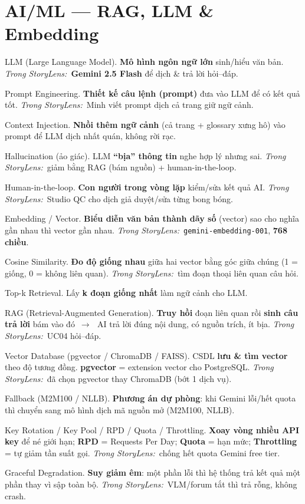 \documentclass[11pt]{article}
\newcommand{\arr}{\,\ensuremath{\rightarrow}\,}
\newcommand{\code}[1]{\texttt{\small #1}}
\newcommand{\insl}{\textit{\textcolor{steel}{Trong StoryLens:}}\ }
\begin{document}
\section{AI/ML --- RAG, LLM \& Embedding}
\begin{terms}
\item[LLM (Large Language Model).] \textbf{Mô hình ngôn ngữ lớn} sinh/hiểu văn bản. \insl \textbf{Gemini 2.5 Flash} để dịch \& trả lời hỏi--đáp.
\item[Prompt Engineering.] \textbf{Thiết kế câu lệnh (prompt)} đưa vào LLM để có kết quả tốt. \insl Minh viết prompt dịch cả trang giữ ngữ cảnh.
\item[Context Injection.] \textbf{Nhồi thêm ngữ cảnh} (cả trang + glossary xưng hô) vào prompt để LLM dịch nhất quán, không rời rạc.
\item[Hallucination (ảo giác).] LLM \textbf{``bịa'' thông tin} nghe hợp lý nhưng sai. \insl giảm bằng RAG (bám nguồn) + human-in-the-loop.
\item[Human-in-the-loop.] \textbf{Con người trong vòng lặp} kiểm/sửa kết quả AI. \insl Studio QC cho dịch giả duyệt/sửa từng bong bóng.
\item[Embedding / Vector.] \textbf{Biểu diễn văn bản thành dãy số} (vector) sao cho nghĩa gần nhau thì vector gần nhau. \insl \code{gemini-embedding-001}, \textbf{768 chiều}.
\item[Cosine Similarity.] \textbf{Đo độ giống nhau} giữa hai vector bằng góc giữa chúng (1 = giống, 0 = không liên quan). \insl tìm đoạn thoại liên quan câu hỏi.
\item[Top-k Retrieval.] Lấy \textbf{k đoạn giống nhất} làm ngữ cảnh cho LLM.
\item[RAG (Retrieval-Augmented Generation).] \textbf{Truy hồi} đoạn liên quan rồi \textbf{sinh câu trả lời} bám vào đó \arr\ AI trả lời đúng nội dung, có nguồn trích, ít bịa. \insl UC04 hỏi--đáp.
\item[Vector Database (pgvector / ChromaDB / FAISS).] CSDL \textbf{lưu \& tìm vector} theo độ tương đồng. \textbf{pgvector} = extension vector cho PostgreSQL. \insl đã chọn pgvector thay ChromaDB (bớt 1 dịch vụ).
\item[Fallback (M2M100 / NLLB).] \textbf{Phương án dự phòng}: khi Gemini lỗi/hết quota thì chuyển sang mô hình dịch mã nguồn mở (M2M100, NLLB).
\item[Key Rotation / Key Pool / RPD / Quota / Throttling.] \textbf{Xoay vòng nhiều API key} để né giới hạn; \textbf{RPD} = Requests Per Day; \textbf{Quota} = hạn mức; \textbf{Throttling} = tự giảm tần suất gọi. \insl chống hết quota Gemini free tier.
\item[Graceful Degradation.] \textbf{Suy giảm êm}: một phần lỗi thì hệ thống trả kết quả một phần thay vì sập toàn bộ. \insl VLM/forum tắt thì trả rỗng, không crash.
\end{terms}
\end{document}
